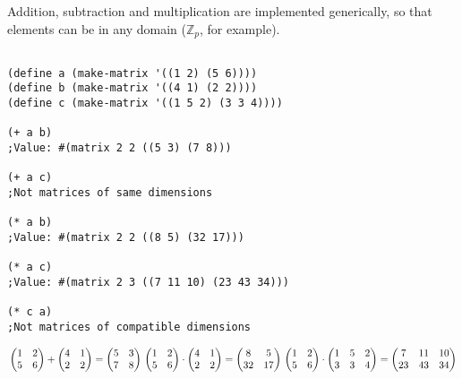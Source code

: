 \documentclass{article}
\begin{document}
				Addition, subtraction and multiplication are implemented generically, so that elements can be in any domain ($\mathbb{Z}_p$, for example).

\begin{minipage}[t]{0.6\textwidth}
\begin{verbatim}

(define a (make-matrix '((1 2) (5 6))))
(define b (make-matrix '((4 1) (2 2))))
(define c (make-matrix '((1 5 2) (3 3 4))))

(+ a b)
;Value: #(matrix 2 2 ((5 3) (7 8)))

(+ a c)
;Not matrices of same dimensions

(* a b)
;Value: #(matrix 2 2 ((8 5) (32 17)))

(* a c)
;Value: #(matrix 2 3 ((7 11 10) (23 43 34)))

(* c a)
;Not matrices of compatible dimensions
\end{verbatim}
\end{minipage}
\begin{minipage}[t]{0.4\textwidth}
$\\ \\ \\ \\ \\ 
\begin{pmatrix}
1&2\\ 5&6
\end{pmatrix} + 
\begin{pmatrix}
4&1\\ 2&2
\end{pmatrix} = 
\begin{pmatrix}
5&3\\ 7&8
\end{pmatrix} \\ \\ \\ \\ \\ \\ 
\begin{pmatrix}
1&2\\ 5&6
\end{pmatrix} \cdot 
\begin{pmatrix}
4&1\\ 2&2
\end{pmatrix} = 
\begin{pmatrix}
8&5\\ 32&17
\end{pmatrix} \\ \\ \\
\begin{pmatrix}
1&2\\ 5&6
\end{pmatrix} \cdot
\begin{pmatrix}
1&5&2\\ 3&3&4
\end{pmatrix} = 
\begin{pmatrix}
7&11&10\\ 23&43&34
\end{pmatrix}$
 
\end{minipage}
            
\end{document}
